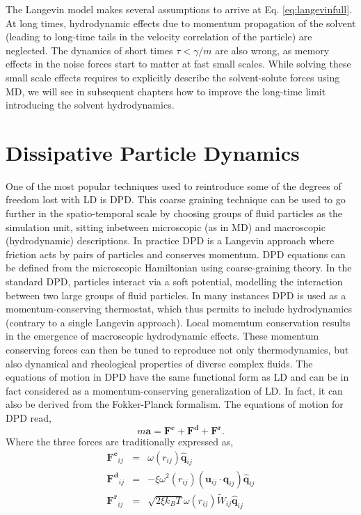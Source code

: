 \documentclass[twoside,openright,titlepage,numbers=noenddot,%
headinclude,footinclude,cleardoublepage=empty,abstract=on,
BCOR=5mm,fontsize=11pt, dvipsnames, paper=b5
]{scrreprt}
\renewcommand{\vec}[1]{\bm{#1}}
\newcommand{\kT}{k_B T}
\newcommand{\ppos}{q}
\newcommand{\pvel}{u}
\begin{document}
The Langevin model makes several assumptions to arrive at Eq. \eqref{eq:langevinfull}. At long times, hydrodynamic effects due to momentum propagation of the solvent (leading to long-time tails in the velocity correlation of the particle) are neglected. The dynamics of short times $\tau<\gamma/m$ are also wrong, as memory effects in the noise forces start to matter at fast small scales. While solving these small scale effects requires to explicitly describe the solvent-solute forces using \gls{MD}, we will see in subsequent chapters how to improve the long-time limit introducing the solvent hydrodynamics.

\chapter{Dissipative Particle Dynamics}\label{ch:dpd}
One of the most popular techniques used to reintroduce some of the degrees of freedom lost with \gls{LD} is \gls{DPD}. This coarse graining technique can be used to go further in the spatio-temporal scale by choosing groups of fluid particles as the simulation unit, sitting inbetween microscopic (as in \gls{MD}) and macroscopic (hydrodynamic) descriptions. In practice \gls{DPD} is a Langevin approach where friction acts by pairs of particles and conserves momentum. \gls{DPD} equations can be defined from the microscopic Hamiltonian using coarse-graining theory\cite{Hijon2010}.
In the standard \gls{DPD}, particles interact via a soft potential, modelling the interaction between two large groups of fluid particles.
In many instances\cite{Sablic2007} \gls{DPD} is used as a momentum-conserving thermostat, which thus permits to include hydrodynamics (contrary to a single Langevin approach). Local momemtum conservation results in the emergence of macroscopic hydrodynamic effects. These momentum conserving forces can then be tuned to reproduce not only thermodynamics, but also dynamical and rheological properties of diverse complex fluids.
The equations of motion in \gls{DPD} have the same functional form as \gls{LD} and can be in fact considered as a momentum-conserving generalization of \gls{LD}. In fact, it can also be derived from the Fokker-Planck formalism\cite{dunweg1991}. The equations of motion for \gls{DPD} read,
\begin{equation}
  \label{eq:dpddyn}
  m\vec{a} = \vec{F^c} + \vec{F^d} + \vec{F^r}.
\end{equation}
Where the three forces are traditionally expressed as\cite{Groot1997,Espanol1995},
\begin{equation}
  \label{eq:dpdforces}
  \begin{aligned}
    \vec{F^c}_{ij} &=&\omega(r_{ij})\hat{\vec{\ppos}}_{ij}\\
    \vec{F^d}_{ij} &=&-\xi\omega^2(r_{ij})(\vec{\pvel}_{ij}\cdot\vec{\ppos}_{ij})\hat{\vec{\ppos}}_{ij}\\
    \vec{F^r}_{ij} &=&\sqrt{2\xi\kT}\omega(r_{ij})\widetilde{W}_{ij}\hat{\vec{\ppos}}_{ij}    
  \end{aligned}
\end{equation}
\end{document}
